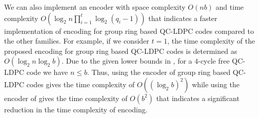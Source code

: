 \documentclass[journal,draftclsnofoot,onecolumn,12pt,twoside]{IEEEtran}
\begin{document}
We can also implement an encoder with space complexity $O(nb)$ and time complexity $O\left(\log_2 n\prod_{i=1}^t \log_2 (q_i-1)\right)$ that indicates a faster implementation of encoding for group ring based QC-LDPC codes compared to the other families. For example, if we consider $t=1$, the time complexity of the proposed encoding for group ring based QC-LDPC codes is determined as $O\left(\log_2 n\log_2 b\right)$. Due to the given lower bounds in \cite{banihashemi}, for a $4$-cycle free QC-LDPC code we have $n\leq b$. Thus, using the encoder of  group ring based QC-LDPC codes gives the time complexity of $O\left((\log_2 b)^2\right)$ while using the encoder of \cite{4} gives the time complexity of $O\left( b^2\right)$ that indicates a significant reduction in the time complexity of encoding.
\end{document}
